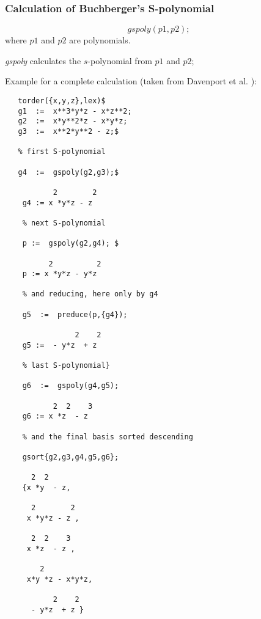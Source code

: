 \subsubsection{Calculation of Buchberger's S-polynomial}
\[ gspoly (p1,p2); \]
where $p1$  and $p2$ are polynomials.

\emph{gspoly} calculates the $s$-polynomial from $p1$  and $p2$;

Example for a complete calculation (taken from {\sc Davenport et al.}
 \cite{Davenport:88a}):
\begin{verbatim}
   torder({x,y,z},lex)$
   g1  :=  x**3*y*z - x*z**2;
   g2  :=  x*y**2*z - x*y*z;
   g3  :=  x**2*y**2 - z;$

   % first S-polynomial

   g4  :=  gspoly(g2,g3);$

           2        2
    g4 := x *y*z - z

    % next S-polynomial

    p :=  gspoly(g2,g4); $

          2          2
    p := x *y*z - y*z

    % and reducing, here only by g4

    g5  :=  preduce(p,{g4});

                2    2
    g5 :=  - y*z  + z

    % last S-polynomial}

    g6  :=  gspoly(g4,g5);

           2  2    3
    g6 := x *z  - z

    % and the final basis sorted descending

    gsort{g2,g3,g4,g5,g6};

      2  2
    {x *y  - z,

      2        2
     x *y*z - z ,

      2  2    3
     x *z  - z ,

        2
     x*y *z - x*y*z,

           2    2
      - y*z  + z }
\end{verbatim}
